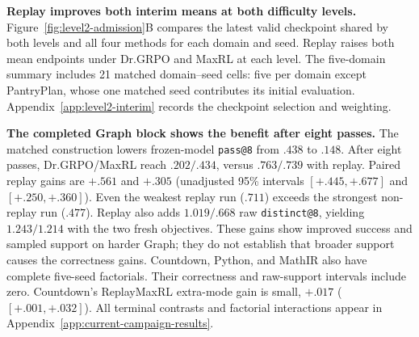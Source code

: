 \documentclass{article}
\newcommand{\1}{\mathbf 1}
\theoremstyle{remark}
\theoremstyle{definition}
\theoremstyle{plain}
\begin{document}
\textbf{Replay improves both interim means at both difficulty levels.}
Figure~\ref{fig:level2-admission}B compares the latest valid checkpoint shared
by both levels and all four methods for each domain and seed. Replay raises
both mean endpoints under Dr.GRPO and MaxRL at each level. The five-domain
summary includes 21 matched domain--seed cells: five per domain except
PantryPlan, whose one matched seed contributes its initial evaluation.
Appendix~\ref{app:level2-interim} records the checkpoint selection and weighting.

\textbf{The completed Graph block shows the benefit after eight passes.}
The matched construction lowers frozen-model \texttt{pass@8} from
\(.438\) to \(.148\). After eight passes, Dr.GRPO/MaxRL reach \(.202/.434\),
versus \(.763/.739\) with replay. Paired replay gains are \(+.561\) and
\(+.305\) (unadjusted 95\% intervals \([+.445,+.677]\) and
\([+.250,+.360]\)). Even the weakest replay run (\(.711\)) exceeds the
strongest non-replay run (\(.477\)). Replay also adds \(1.019/.668\) raw
\texttt{distinct@8}, yielding \(1.243/1.214\) with the two fresh objectives.
These gains show improved success and sampled support on harder Graph;
they do not establish that broader support causes the correctness gains.
Countdown, Python, and MathIR also have complete five-seed factorials.
Their correctness and raw-support intervals include zero. Countdown's
ReplayMaxRL extra-mode gain is small, $+.017$ ($[+.001,+.032]$).
All terminal contrasts and factorial interactions appear in
Appendix~\ref{app:current-campaign-results}.

\long{}
\end{document}
